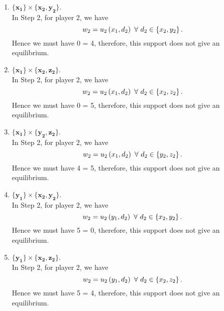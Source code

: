 \begin{enumerate} [label=\Alph*. ]
\begin{enumerate} [label*= (\arabic*)]
    \item $\mathbf{\{x_1\}} \times \mathbf{\{x_2, y_2\}}$. \\
        In Step 2, for player 2, we have
        \begin{equation*}
            w_2 = u_2 \left(x_1, d_2\right) \ \forall \ d_2 \in \left\{x_2, y_2\right\}.
        \end{equation*}
        Hence we must have 0 = 4, therefore, this support does not give an equilibrium.
        
    \item $\mathbf{\{x_1\}} \times \mathbf{\{x_2, z_2\}}$. \\
        In Step 2, for player 2, we have
        \begin{equation*}
            w_2 = u_2 \left(x_1, d_2\right) \ \forall \ d_2 \in \left\{x_2, z_2\right\}.
        \end{equation*}
        Hence we must have 0 = 5, therefore, this support does not give an equilibrium.
        
    \item $\mathbf{\{x_1\}} \times \mathbf{\{y_2, z_2\}}$. \\
        In Step 2, for player 2, we have
        \begin{equation*}
            w_2 = u_2 \left(x_1, d_2\right) \ \forall \ d_2 \in \left\{y_2, z_2\right\}.
        \end{equation*}
        Hence we must have 4 = 5, therefore, this support does not give an equilibrium.
        
    \item $\mathbf{\{y_1\}} \times \mathbf{\{x_2, y_2\}}$. \\
        In Step 2, for player 2, we have
        \begin{equation*}
            w_2 = u_2 \left(y_1, d_2\right) \ \forall \ d_2 \in \left\{x_2, y_2\right\}.
        \end{equation*}
        Hence we must have 5 = 0, therefore, this support does not give an equilibrium.
        
    \item $\mathbf{\{y_1\}} \times \mathbf{\{x_2, z_2\}}$. \\
        In Step 2, for player 2, we have
        \begin{equation*}
            w_2 = u_2 \left(y_1, d_2\right) \ \forall \ d_2 \in \left\{x_2, z_2\right\}.
        \end{equation*}
        Hence we must have 5 = 4, therefore, this support does not give an equilibrium.
        

\end{enumerate}
\end{enumerate}
